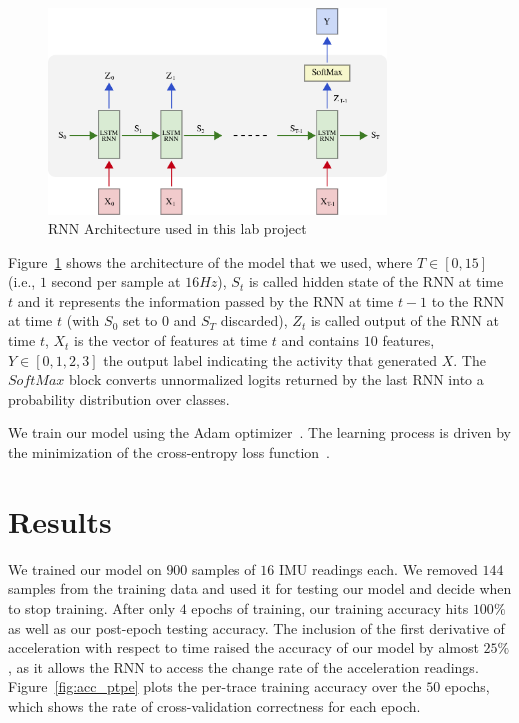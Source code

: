 \documentclass{article}
\begin{document}
\begin{figure}[t]
    \centering
    \vspace{-8pt}
    \includegraphics[width=0.8\textwidth]{figures/rnn_full}
    \caption{RNN Architecture used in this lab project \label{fig:rnn_architecture}}
    \vspace{-6pt}
\end{figure}

Figure~\ref{fig:rnn_architecture} shows the architecture of the model that we used, where
$T \in [0,15]$ (i.e., $1$ second per sample at $16Hz$), $S_t$ is called hidden state of the
RNN at time $t$ and it represents the information passed by the RNN at time $t-1$ to the RNN
at time $t$ (with $S_0$ set to $0$ and $S_T$ discarded), $Z_t$ is called output of the RNN
at time $t$, $X_t$ is the vector of features at time $t$ and contains $10$ features,
$Y \in [0,1,2,3]$ the output label indicating the activity that generated $X$.
The $SoftMax$ block converts
unnormalized logits returned by the last RNN into a probability distribution over classes.

We train our model using the Adam optimizer~\cite{kingma2014adam}.
The learning process is driven by the minimization of the cross-entropy loss
function~\cite{rubinstein1999cross}.


\section{Results}
\vspace{-.3cm} 
We trained our model on $900$ samples of $16$ IMU readings each. We removed $144$ samples
from the training data and used it for testing our model and decide when to stop training.
After only $4$ epochs of training, our training accuracy hits $100\%$ as well as our 
post-epoch testing accuracy. 
The inclusion of the first derivative of acceleration with respect to time raised the accuracy 
of our model by almost $25\%$, as it allows the RNN to access the change rate of the 
acceleration readings. Figure~\ref{fig:acc_ptpe} plots the per-trace training
accuracy over the $50$ epochs, which shows the rate of cross-validation correctness 
for each epoch.
\end{document}
